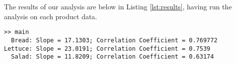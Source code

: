 The results of our analysis are below in Listing \ref{lst:results}, having run the analysis on each product data.

\begin{verbatim}
>> main
  Bread: Slope = 17.1303; Correlation Coefficient = 0.769772
Lettuce: Slope = 23.0191; Correlation Coefficient = 0.7539
  Salad: Slope = 11.8209; Correlation Coefficient = 0.63174
\end{verbatim}

 


